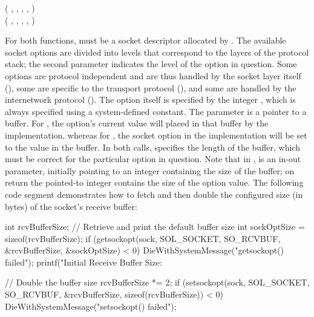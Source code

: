 \begin{inlinefcn}
 ( ,  ,  , , ) \\
 ( ,  ,  , ,  )
\end{inlinefcn}
For both functions,  must be a socket descriptor 
allocated by .  
The available socket options are divided
into levels that correspond to the layers of the
protocol stack; the second parameter indicates the level of the option
in question.
Some options are protocol independent and are thus
handled by the socket layer itself  (),
some are specific to the transport protocol
(),
and some are handled by the internetwork  protocol
().
The option itself is specified by the integer , which
is always specified using a system-defined constant.
The parameter 
is a pointer to a buffer.  For ,
the option's current value will placed in that buffer by the
implementation, whereas
for ,
the socket option in the implementation will be
set to the value in the buffer.
In both calls,  specifies the length of the
buffer, which must be correct
for the particular option in question.
Note that in ,  is an
in-out parameter,
initially pointing to an integer containing
the size of the buffer; on return the pointed-to integer contains
the size of the option value.
The following code segment demonstrates how to fetch and then double
the configured size (in bytes) of the socket's receive buffer:

\label{code:socketoption}
\begin{inlinecode}
int rcvBufferSize;
// Retrieve and print the default buffer size
int sockOptSize = sizeof(rcvBufferSize);
if (getsockopt(sock, SOL_SOCKET, SO_RCVBUF, &rcvBufferSize, &sockOptSize) < 0)
    DieWithSystemMessage("getsockopt() failed");
printf("Initial Receive Buffer Size: %

// Double the buffer size
rcvBufferSize *= 2;
if (setsockopt(sock, SOL_SOCKET, SO_RCVBUF, &rcvBufferSize, sizeof(rcvBufferSize)) < 0)
    DieWithSystemMessage("setsockopt() failed");
\end{inlinecode}

